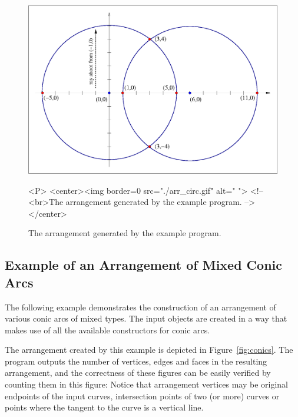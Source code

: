 \begin{figure}[h]
\begin{ccTexOnly}
{\centerline {\includegraphics{arr_circ.ps}}}
\end{ccTexOnly}
\caption{The arrangement generated by the example program.\label{fig:circles}}
\begin{ccHtmlOnly}
<P>
<center><img border=0 src="./arr_circ.gif" alt=" ">
<!-- <br>The arrangement generated by the example program. -->
</center>
\end{ccHtmlOnly}
\end{figure}


\subsection{Example of an Arrangement of Mixed Conic Arcs}
\label{ssec:example13}

The following example demonstrates the construction of an arrangement
of various conic arcs of mixed types. The input  objects are
created in a way that makes use of all the available constructors for conic
arcs.

The arrangement created  by this example is depicted in 
Figure~\ref{fig:conics}. The program outputs the number of vertices, edges and
faces in the resulting arrangement, and the correctness of these figures can
be easily verified by counting them in this figure: Notice that arrangement
vertices may be original endpoints of the input curves, intersection points
of two (or more) curves or points where the tangent to the curve is a vertical
line.

